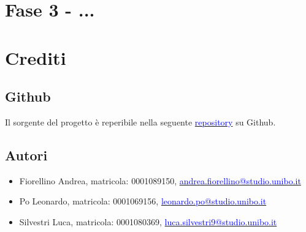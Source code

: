\documentclass{article}
\begin{document}
\newpage

\section{Fase 3 - ...}

\newpage

\section{Crediti}
\subsection{Github}
Il sorgente del progetto è reperibile nella seguente \href{https://github.com/aNdReA9111/PandOS.git}{\textcolor{blue}{repository}} su Github.

\subsection{Autori}
\begin{itemize}
    \item Fiorellino Andrea, matricola: 0001089150, \href{mailto:andrea.fiorellino@studio.unibo.it}{\textcolor{blue}{andrea.fiorellino@studio.unibo.it}}
    \item Po Leonardo, matricola: 0001069156, \href{mailto:leonardo.po@studio.unibo.it}{\textcolor{blue}{leonardo.po@studio.unibo.it}}
    \item Silvestri Luca, matricola: 0001080369, \href{mailto:luca.silvestri9@studio.unibo.it}{\textcolor{blue}{luca.silvestri9@studio.unibo.it}}
\end{itemize}
\end{document}
